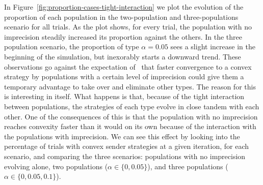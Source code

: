 \documentclass[a4paper]{article}
\begin{document}
In Figure~\ref{fig:proportion-cases-tight-interaction} we plot the evolution of the proportion of each population in the two-population and three-populations scenario for all trials.
As the plot shows, for every trial, the population with no imprecision steadily increased its proportion against the others.
In the three population scenario, the proportion of type $\alpha = 0.05$ sees a slight increase in the beginning of the simulation, but inexorably starts a downward trend.
These observations go against the expectation of~\textcite{franke_vagueness_2017} that faster convergence to a convex strategy by populations with a certain level of imprecision could give them a temporary advantage to take over and eliminate other types.
The reason for this is interesting in itself.
What happens is that, because of the tight interaction between populations, the strategies of each type evolve in close tandem with each other.
One of the consequences of this is that the population with no imprecision reaches convexity faster than it would on its own because of the interaction with the populations with imprecision.
We can see this effect by looking into the percentage of trials with convex sender strategies at a given iteration, for each scenario, and comparing the three scenarios: populations with no imprecision evolving alone, two populations ($\alpha \in \{0, 0.05\}$), and three populations ($\alpha \in \{0, 0.05, 0.1\}$).
\end{document}
